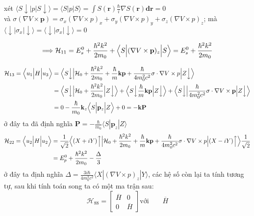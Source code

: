 xét $\langle S\downarrow |p|S\downarrow\rangle=\langle S|p|S\rangle=\int S(\mathbf{r})\frac{\hbar}{i}\nabla S(\mathbf{r})\mathbf{dr} =0$\\
và $\sigma(\nabla V\times \mathbf{p})=\sigma_x(\nabla V\times p)_x+\sigma_y(\nabla V\times p)_y+\sigma_z(\nabla V\times p)_z$;
mà $\langle\downarrow|\sigma_x|\downarrow\rangle=\langle\downarrow|\sigma_x|\downarrow\rangle=0$

\begin{equation}
\Longrightarrow \mathcal{H}_{11}= E_s^0 +\frac{\hbar^2 k^2}{2m_0}+\Bigl\langle S\Bigl\vert(\nabla V\times \mathbf{p})_z\Bigr\vert S\Bigr\rangle=E_s^0 +\frac{\hbar^2 k^2}{2m_0} 
\end{equation}

\begin{align*}
\mathcal{H}_{13}=\Bigl\langle u_1\Bigl\vert H \Bigr\vert u_3\Bigr\rangle  &=\Bigl\langle S\Bigl\downarrow \Bigl\vert \mathcal{H}_0+\frac{\hbar^2 k^2}{2m_0} +\frac{\hbar}{m}\mathbf{kp}+\frac{\hbar}{4m_0^2c^2}\sigma\cdot\nabla V\times p \Bigr\vert Z\Bigr\downarrow \Bigr\rangle \\
&=\Bigl\langle S\Bigl\downarrow \Bigl\vert \mathcal{H}_0+\frac{\hbar^2 k^2}{2m_0}\Bigr\vert Z\Bigr\downarrow\Bigr\rangle + \Bigl\langle S\Bigl\downarrow\frac{\hbar}{m}\mathbf{kp}\Bigr\vert Z\Bigr\downarrow\Bigr\rangle + \Bigl\langle S\Bigl\downarrow\Bigl\vert \frac{\hbar}{4m_0^2c^2}\sigma\cdot\nabla V\times \mathbf{p} \Bigr\vert Z\Bigr\downarrow\Bigr\rangle\\
&=0 -\frac{\hbar}{m_0}\mathbf{k}_z\Bigl\langle S\Bigl\vert\mathbf{p}_z\Bigr\vert Z\Bigr\rangle + 0=-\mathbf{k}\mathbf{P}
\end{align*}
ở đây ta đã định nghĩa $\mathbf{P}=-\frac{\hbar}{m_0}\langle S|\mathbf{p}_z|Z\rangle$
\begin{align*}
\mathcal{H}_{22}=\Bigl\langle u_2\Bigl\vert H \Bigr\vert u_2\Bigr\rangle &=\frac{1}{\sqrt{2}}\Bigl\langle (X+iY)\Bigl\uparrow\Bigl\vert \mathcal{H}_0+\frac{\hbar^2 k^2}{2m_0} +\frac{\hbar}{m}\mathbf{kp}+\frac{\hbar}{4m_0^2c^2}\sigma\cdot\nabla V\times p \Bigr\vert(X-iY)\Bigr\uparrow\Bigr\rangle \frac{1}{\sqrt{2}}  \\
&=E_p^0 +\frac{\hbar^2 k^2}{2m_0}- \frac{\Delta}{3}
\end{align*}
ở đây ta định nghĩa $\Delta=\frac{3i\hbar}{4m_0^2c^2}\langle X|(\nabla V\times p)_z|Y\rangle$, các hệ số còn lại ta tính tương tự, sau khi tính toán song ta có một ma trận sau:
\begin{equation}
\mathcal{H}_{88}=\begin{bmatrix}
\overline{H} &0 \\
0 & \overline{H}
\end{bmatrix} \text{với} \qquad \overline{H}
\end{equation}
